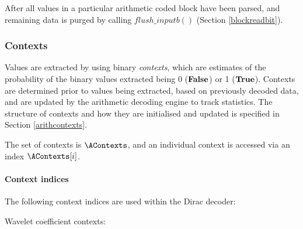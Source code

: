 After all values in a particular arithmetic coded block have been parsed, and remaining data
is purged by calling $flush\_inputb()$ (Section \ref{blockreadbit}).

\subsubsection{Contexts}


Values are extracted by using binary {\em contexts}, which are estimates of the 
probability of the binary values extracted being 0 ($\text{\bf{False}}$) or 1 ($\text{\bf{True}}$).
Contexts are determined prior to values being extracted, based on previously
decoded data, and are updated by the arithmetic decoding engine to track 
statistics. The structure of contexts and how they are initialised and updated 
is specified in Section \ref{arithcontexts}.

The set of contexts is $\AContexts$, and an individual context is accessed via
an index $\AContexts[i]$. 

\paragraph{Context indices\\}
\label{contextindices}

The following context indices are used within the Dirac decoder:

Wavelet coefficient contexts:

\SignZero\\
\SignPos\\
\SignNeg\\
\ZPZNFollowOne\\
\ZPNNFollowOne\\
\ZPFollowTwo\\
\ZPFollowThree\\
\ZPFollowFour\\
\ZPFollowFive\\
\ZPFollowSixPlus\\
\NPZNFollowOne\\
\NPNNFollowOne\\
\NPFollowTwo\\
\NPFollowThree\\
\NPFollowFour\\
\NPFollowFive\\
\NPFollowSixPlus\\
\CoeffData\\
\ZeroCodeblock\\
\QOffsetFollow\\
\QOffsetData\\
\QOffsetSign\\

